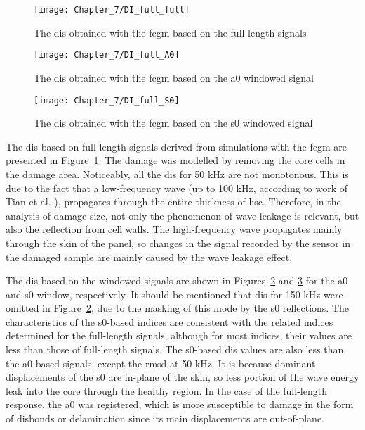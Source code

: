 \documentclass[11pt,a4paper,final]{report}
\theoremstyle{plain}
\begin{document}
\begin{figure}[!tbh]
	\begin{center}
		\texttt{[image: Chapter\_7/DI\_full\_full]}
	\end{center}
	\caption{The \aclp{di} obtained with the \acl{fcgm} based on the full-length signals}
	\label{fig:DI_full_full}
\end{figure}
\begin{figure}[!tbh]
	\begin{center}
		\texttt{[image: Chapter\_7/DI\_full\_A0]}
	\end{center}
	\caption{The \aclp{di} obtained with the \acl{fcgm} based on the \acs{a0} windowed signal}
	\label{fig:DI_full_A0}
\end{figure}
\begin{figure}[!tbh]
	\begin{center}
		\texttt{[image: Chapter\_7/DI\_full\_S0]}
	\end{center}
	\caption{The \aclp{di} obtained with the \acl{fcgm} based on the \acs{s0} windowed signal}
	\label{fig:DI_full_S0}
\end{figure}

The \acp{di} based on full-length signals derived from simulations with the \ac{fcgm} are presented in Figure~\ref{fig:DI_full_full}.
The damage was modelled by removing the core cells in the damage area.
Noticeably, all the \acp{di} for 50 \unit{\kHz} are not monotonous.
This is due to the fact that a low-frequency wave (up to 100 \unit{\kHz}, according to work of Tian et al. \cite{tian2015wavenumber}), propagates through the entire thickness of \ac{hsc}.
Therefore, in the analysis of damage size, not only the phenomenon of wave leakage is relevant, but also the reflection from cell walls.  
The high-frequency wave propagates mainly through the skin of the panel, so changes in the signal recorded by the sensor in the damaged sample are mainly caused by the wave leakage effect.

The \acp{di} based on the windowed signals are shown in Figures~\ref{fig:DI_full_A0} and \ref{fig:DI_full_S0} for the \ac{a0} and \ac{s0} window, respectively.
It should be mentioned that \acp{di} for 150 \unit{\kHz} were omitted in Figure~\ref{fig:DI_full_A0}, due to the masking of this mode by the \ac{s0} reflections.
The characteristics of the \ac{s0}-based indices are consistent with the related indices determined for the full-length signals, although for most indices, their values are less than those of full-length signals.
The \ac{s0}-based \acp{di} values are also less than the \ac{a0}-based signals, except the \ac{rmsd} at 50 \unit{kHz}.
It is because dominant displacements of the \ac{s0} are in-plane of the skin, so less portion of the wave energy leak into the core through the healthy region.
In the case of the full-length response, the \ac{a0} was registered, which is more susceptible to damage in the form of disbonds or delamination since its main displacements are out-of-plane.
\end{document}
